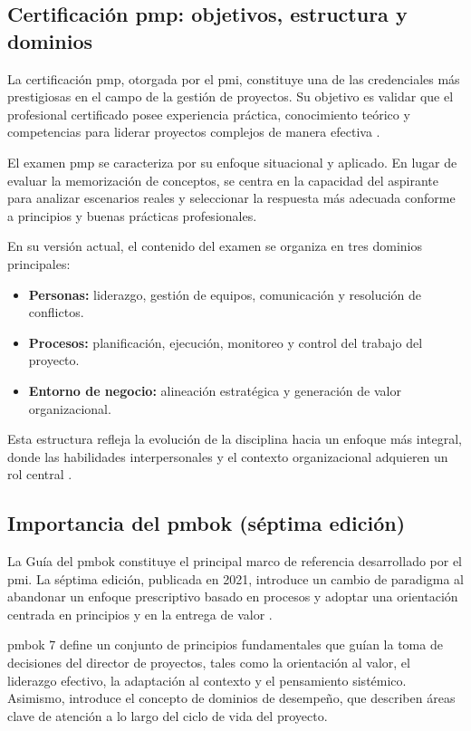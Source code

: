 \subsection{Certificación \gls{pmp}: objetivos, estructura y dominios}

La certificación \gls{pmp}, otorgada por el \gls{pmi}, constituye una de las credenciales más prestigiosas en el campo de la gestión de proyectos. Su objetivo es validar que el profesional certificado posee experiencia práctica, conocimiento teórico y competencias para liderar proyectos complejos de manera efectiva \parencite{pmi2021handbook}.

El examen \gls{pmp} se caracteriza por su enfoque situacional y aplicado. En lugar de evaluar la memorización de conceptos, se centra en la capacidad del aspirante para analizar escenarios reales y seleccionar la respuesta más adecuada conforme a principios y buenas prácticas profesionales.

En su versión actual, el contenido del examen se organiza en tres dominios principales:
\begin{itemize}
    \item \textbf{Personas:} liderazgo, gestión de equipos, comunicación y resolución de conflictos.
    \item \textbf{Procesos:} planificación, ejecución, monitoreo y control del trabajo del proyecto.
    \item \textbf{Entorno de negocio:} alineación estratégica y generación de valor organizacional.
\end{itemize}

Esta estructura refleja la evolución de la disciplina hacia un enfoque más integral, donde las habilidades interpersonales y el contexto organizacional adquieren un rol central \parencite{pmi2021handbook}.

\subsection{Importancia del \gls{pmbok} (séptima edición)}

La Guía del \gls{pmbok} constituye el principal marco de referencia desarrollado por el \gls{pmi}. La séptima edición, publicada en 2021, introduce un cambio de paradigma al abandonar un enfoque prescriptivo basado en procesos y adoptar una orientación centrada en principios y en la entrega de valor \parencite{pmbok7}.

\gls{pmbok} 7 define un conjunto de principios fundamentales que guían la toma de decisiones del director de proyectos, tales como la orientación al valor, el liderazgo efectivo, la adaptación al contexto y el pensamiento sistémico. Asimismo, introduce el concepto de dominios de desempeño, que describen áreas clave de atención a lo largo del ciclo de vida del proyecto.

